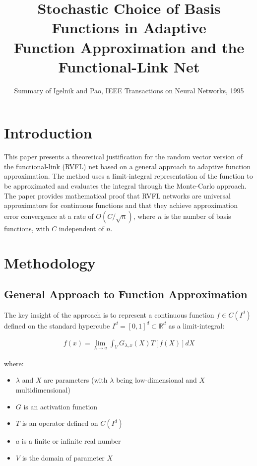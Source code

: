 \documentclass[11pt]{article}
\title{Stochastic Choice of Basis Functions in Adaptive\\Function Approximation and the Functional-Link Net}
\author{Summary of Igelnik and Pao, IEEE Transactions on Neural Networks, 1995}
\date{}
\begin{document}
\maketitle

\section{Introduction}

This paper presents a theoretical justification for the random vector version of the functional-link (RVFL) net based on a general approach to adaptive function approximation. The method uses a limit-integral representation of the function to be approximated and evaluates the integral through the Monte-Carlo approach. The paper provides mathematical proof that RVFL networks are universal approximators for continuous functions and that they achieve approximation error convergence at a rate of $O(C/\sqrt{n})$, where $n$ is the number of basis functions, with $C$ independent of $n$.

\section{Methodology}

\subsection{General Approach to Function Approximation}

The key insight of the approach is to represent a continuous function $f \in C(I^d)$ defined on the standard hypercube $I^d = [0,1]^d \subset \mathbb{R}^d$ as a limit-integral:

\begin{align}
f(x) = \lim_{\lambda \rightarrow a} \int_V G_{\lambda,x}(X)T[f(X)]dX
\end{align}

where:
\begin{itemize}
    \item $\lambda$ and $X$ are parameters (with $\lambda$ being low-dimensional and $X$ multidimensional)
    \item $G$ is an activation function 
    \item $T$ is an operator defined on $C(I^d)$
    \item $a$ is a finite or infinite real number
    \item $V$ is the domain of parameter $X$
\end{itemize}
\end{document}
